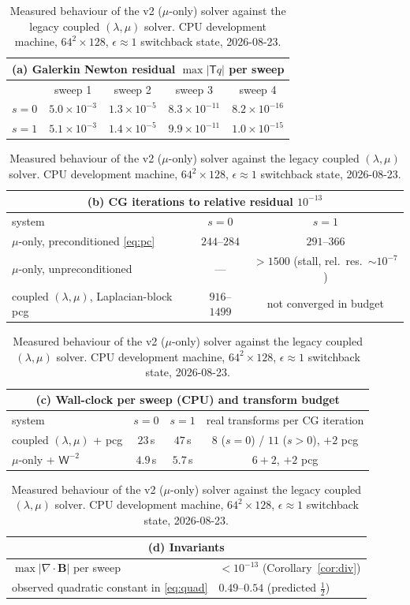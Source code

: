 \documentclass[11pt]{article}
\theoremstyle{definition}
\newcommand{\B}{\mathbf{B}}
\newcommand{\Tr}{\mathsf{T}}
\newcommand{\Wm}{\mathsf{W}}
\begin{document}
\begin{table}[htbp]
\centering
\caption{Measured behaviour of the v2 ($\mu$-only) solver against the legacy
coupled $(\lambda,\mu)$ solver. CPU development machine, $64^2\times128$,
$\epsilon\approx1$ switchback state, 2026-08-23.}
\label{tab:measured}
\medskip
\small
\begin{tabular}{lcccc}
\multicolumn{5}{c}{\textbf{(a) Galerkin Newton residual $\max|\Tr q|$ per sweep}}\\
\toprule
& sweep 1 & sweep 2 & sweep 3 & sweep 4\\
\midrule
$s=0$ & $5.0\times10^{-3}$ & $1.3\times10^{-5}$ & $8.3\times10^{-11}$ & $8.2\times10^{-16}$\\
$s=1$ & $5.1\times10^{-3}$ & $1.4\times10^{-5}$ & $9.9\times10^{-11}$ & $1.0\times10^{-15}$\\
\bottomrule
\end{tabular}

\medskip
\begin{tabular}{lcc}
\multicolumn{3}{c}{\textbf{(b) CG iterations to relative residual $10^{-13}$}}\\
\toprule
system & $s=0$ & $s=1$\\
\midrule
$\mu$-only, preconditioned \eqref{eq:pc} & $244$--$284$ & $291$--$366$\\
$\mu$-only, unpreconditioned & --- & $>1500$ (stall, rel.\ res.\ $\sim10^{-7}$)\\
coupled $(\lambda,\mu)$, Laplacian-block pcg & $916$--$1499$ & not converged in budget\\
\bottomrule
\end{tabular}

\medskip
\begin{tabular}{lccc}
\multicolumn{4}{c}{\textbf{(c) Wall-clock per sweep (CPU) and transform budget}}\\
\toprule
system & $s=0$ & $s=1$ & real transforms per CG iteration\\
\midrule
coupled $(\lambda,\mu)$ + pcg & $23$\,s & $47$\,s & $8$ ($s=0$) / $11$ ($s>0$), $+2$ pcg\\
$\mu$-only + $\Wm^{-2}$ & $4.9$\,s & $5.7$\,s & $6+2$, $+2$ pcg\\
\bottomrule
\end{tabular}

\medskip
\begin{tabular}{ll}
\multicolumn{2}{c}{\textbf{(d) Invariants}}\\
\toprule
$\max|\nabla\cdot\B|$ per sweep & $<10^{-13}$ (Corollary~\ref{cor:div})\\
observed quadratic constant in \eqref{eq:quad} & $0.49$--$0.54$ (predicted $\tfrac12$)\\
\bottomrule
\end{tabular}
\end{table}
\end{document}
